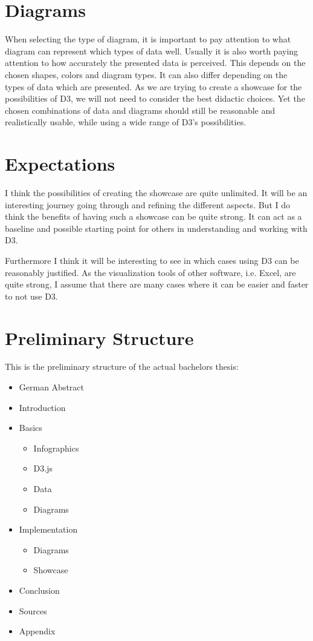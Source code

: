 \documentclass[
a4paper,     %
12pt         %
]{scrartcl}  %
\begin{document}
\section{Diagrams}
When selecting the type of diagram, it is important to pay attention to what diagram can represent which types of data well. Usually it is also worth paying attention to how accurately the presented data is perceived. This depends on the chosen shapes, colors and diagram types\cite{heer2010crowdsourcing}. It can also differ depending on the types of data which are presented\cite{mackinlay1986automating}. As we are trying to create a showcase for the possibilities of D3, we will not need to consider the best didactic choices. Yet the chosen combinations of data and diagrams should still be reasonable and realistically usable, while using a wide range of D3's possibilities.

\section{Expectations}
I think the possibilities of creating the showcase are quite unlimited. It will be an interesting journey going through and refining the different aspects. But I do think the benefits of having such a showcase can be quite strong. It can act as a baseline and possible starting point for others in understanding and working with D3. 

Furthermore I think it will be interesting to see in which cases using D3 can be reasonably justified. As the visualization tools of other software, i.e. Excel, are quite strong, I assume that there are many cases where it can be easier and faster to not use D3. 

\section{Preliminary Structure}
This is the preliminary structure of the actual bachelors thesis:

\begin{itemize}
  \item German Abstract
  \item Introduction
  \item Basics
  \begin{itemize}
    \item Infographics
    \item D3.js
    \item Data
    \item Diagrams
  \end{itemize}
  \item Implementation
  \begin{itemize}
    \item Diagrams
    \item Showcase
  \end{itemize}
  \item Conclusion
  \item Sources
  \item Appendix
\end{itemize}
\end{document}
